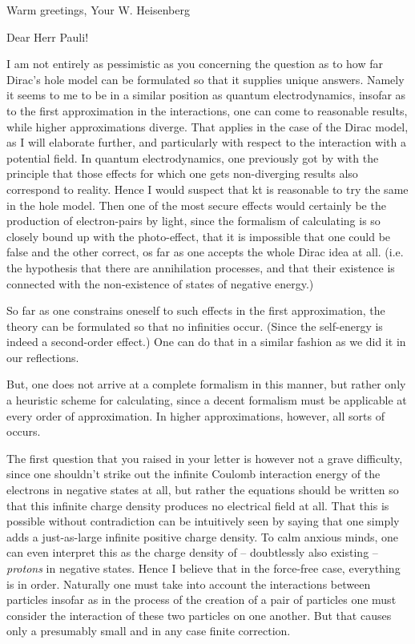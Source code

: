 \documentclass{article}
\begin{document}
Warm greetings,
Your W. Heisenberg

\date{July 17, 1933}

Dear Herr Pauli!

I am not entirely as pessimistic as you concerning the question as to how far Dirac's hole model can be formulated so that it supplies unique answers. Namely it seems to me to be in a similar position as quantum electrodynamics, insofar as to the first approximation in the interactions, one can come to reasonable results, while higher approximations diverge. That applies in the case of the Dirac model, as I will elaborate further, and particularly with respect to the interaction with a potential field. In quantum electrodynamics, one previously got by with the principle that those effects for which one gets non-diverging results also correspond to reality. Hence I would suspect that kt is reasonable to try the same in the hole model. Then one of the most secure effects would certainly be the production of electron-pairs by light, since the formalism of calculating is so closely bound up with the photo-effect, that it is impossible that one could be false and the other correct, os far as one accepts the whole Dirac idea at all. (i.e. the hypothesis that there are annihilation processes, and that their existence is connected with the non-existence of states of negative energy.)

So far as one constrains oneself to such effects in the first approximation, the theory can be formulated so that no infinities occur. (Since the self-energy is indeed a second-order effect.) One can do that in a similar fashion as we did it in our reflections.

But, one does not arrive at a complete formalism in this manner, but rather only a heuristic scheme for calculating, since a decent formalism must be applicable at every order of approximation. In higher approximations, however, all sorts of  occurs.

The first question that you raised in your letter is however not a grave difficulty, since one shouldn't strike out the infinite Coulomb interaction energy of the electrons in negative states at all, but rather the equations should be written so that this infinite charge density produces no electrical field at all. That this is possible without contradiction can be intuitively seen by saying that one simply adds a just-as-large infinite positive charge density. To calm anxious minds, one can even interpret this as the charge density of -- doubtlessly also existing -- \textit{protons} in negative states. Hence I believe that in the force-free case, everything is in order. Naturally one must take into account the interactions between particles insofar as in the process of the creation of a pair of particles one must consider the interaction of these two particles on one another. But that causes only a presumably small and in any case finite correction.
\end{document}
